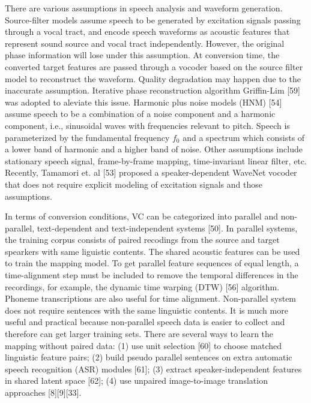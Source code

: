 \documentclass{article}
\begin{document}
There are various assumptions in speech analysis and waveform generation. Source-filter models assume speech to be generated by excitation signals passing through a vocal tract, and encode speech waveforms as acoustic features that represent sound source and vocal tract independently. However, the original phase information will lose under this assumption. At conversion time, the converted target features are passed through a vocoder based on the source filter model to reconstruct the waveform. Quality degradation may happen due to the inaccurate assumption. Iterative phase reconstruction algorithm Griffin-Lim [59] was adopted to aleviate this issue. Harmonic plus noise models (HNM) [54] assume speech to be a combination of a noise component and a harmonic component, i.e., sinusoidal waves with frequencies relevant to pitch. Speech is parameterized by the fundamental frequency $f_0$ and a spectrum which consists of a lower band of harmonic and a higher band of noise. Other assumptions include
stationary speech signal, %
frame-by-frame mapping, %
time-invariant linear filter, etc. Recently, Tamamori et. al [53] proposed a speaker-dependent WaveNet vocoder that does not require explicit modeling of excitation signals and those assumptions.


In terms of conversion conditions, VC can be categorized into parallel and non-parallel, text-dependent and text-independent systems [50]. In parallel systems, the training corpus consists of paired recodings from the source and target spearkers with same liguistic contents. The shared acoustic features can be used to train the mapping model. To get parallel feature sequences of equal length, a time-alignment step must be included to remove the temporal differences in the recordings, for example, the dynamic time warping (DTW) [56] algorithm. Phoneme transcriptions are also useful for time alignment. Non-parallel system does not require sentences with the same linguistic contents. It is much more useful and practical because non-parallel speech data is easier to collect and therefore can get larger training sets. There are several ways to learn the mapping without paired data: (1) use unit selection [60] to choose matched linguistic feature pairs; (2) build pseudo parallel sentences on extra automatic speech recognition (ASR) modules [61]; (3) extract speaker-independent features in shared latent space [62]; (4) use unpaired image-to-image translation approaches [8][9][33].
\end{document}

